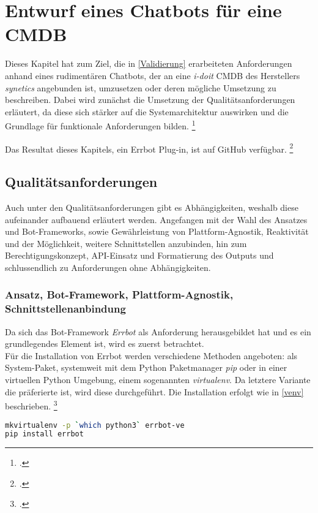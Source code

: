 \chapter{Entwurf eines Chatbots für eine CMDB} \label{Praxis}

Dieses Kapitel hat zum Ziel, die in \autoref{Validierung} erarbeiteten Anforderungen anhand eines rudimentären Chatbots, der an eine \textit{i-doit} \acs{CMDB} des Herstellers \textit{synetics} angebunden ist, umzusetzen oder deren mögliche Umsetzung zu beschreiben. Dabei wird zunächst die Umsetzung der Qualitätsanforderungen erläutert, da diese sich stärker auf die Systemarchitektur auswirken und die Grundlage für funktionale Anforderungen bilden.
\footcite[Vgl.][9]{Pohl_2015_Requirements}

Das Resultat dieses Kapitels, ein Errbot Plug-in, ist auf GitHub verfügbar.
\footcite[Vgl.][o. \pno]{Weiss_2019_GitHub}

\section{Qualitätsanforderungen}

Auch unter den Qualitätsanforderungen gibt es Abhängigkeiten, weshalb diese aufeinander aufbauend erläutert werden. Angefangen mit der Wahl des Ansatzes und Bot-Frameworks, sowie Gewährleistung von Plattform-Agnostik, Reaktivität und der Möglichkeit, weitere Schnittstellen anzubinden, hin zum Berechtigungskonzept, API-Einsatz und Formatierung des Outputs und schlussendlich zu Anforderungen ohne Abhängigkeiten. 


\subsection{Ansatz, Bot-Framework, Plattform-Agnostik, Schnittstellenanbindung}

Da sich das Bot-Framework \textit{Errbot} als Anforderung herausgebildet hat und es ein grundlegendes Element ist, wird es zuerst betrachtet.\\
Für die Installation von Errbot werden verschiedene Methoden angeboten: als System-Paket, systemweit mit dem Python Paketmanager \textit{pip} oder in einer virtuellen Python Umgebung, einem sogenannten \textit{virtualenv}. Da letztere Variante die präferierte ist, wird diese durchgeführt. Die Installation erfolgt wie in \autoref{venv} beschrieben.
\footcite[Vgl.][o. \pno]{errbot_2018_setup}

\begin{lstlisting}[language=bash, label=venv, caption=Virtualenv Einrichtung und Errbot Installation]
mkvirtualenv -p `which python3` errbot-ve
pip install errbot
\end{lstlisting}

